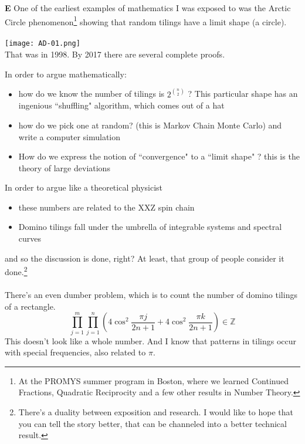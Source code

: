\documentclass[12pt]{article}
\begin{document}
\selectfont \fontsize{20}{25}\selectfont


\newpage

\noindent \textbf{E} One of the earliest examples of mathematics I was exposed to was the Arctic Circle phenomenon\footnote{At the PROMYS summer program in Boston, where we learned Continued Fractions, Quadratic Reciprocity and a few other results in Number Theory.} showing that random tilings have a limit shape (a circle).  \\ \\
\texttt{[image: AD-01.png]} \\
That was in 1998.  By 2017 there are several complete proofs.  

\newpage

\noindent In order to argue mathematically:
\begin{itemize}
\item how do we know the number of tilings is $2^{\binom{n}{2}}$ ? This particular shape has an ingenious ``shuffling" algorithm, which comes out of a hat
\item how do we pick one at random?   (this is Markov Chain Monte Carlo) and write a computer simulation
\item How do we express the notion of ``convergence" to a ``limit shape" ? this is the theory of large deviations
\end{itemize} 

\noindent In order to argue like a theoretical physicist
\begin{itemize}
\item these numbers are related to the XXZ spin chain
\item Domino tilings fall under the umbrella of integrable systems and spectral curves
\end{itemize}
and so the discussion is done, right?  At least, that group of people consider it done.\footnote{There's a duality between exposition and research.  I would like to hope that you can tell the story better, that can be channeled into a better technical result.}  \\ \\
There's an even dumber problem, which is to count the number of domino tilings of a rectangle.  
$$ \prod_{j=1}^{m}\prod_{j=1}^{n} \left( 4 \cos^2 \frac{\pi j}{2n+1} 
+ 4 \cos^2 \frac{\pi k}{2n+1} \right) \in \mathbb{Z}$$
This doesn't look like a whole number. And I know that patterns in tilings occur with special frequencies, also related to $\pi$.
\end{document}
